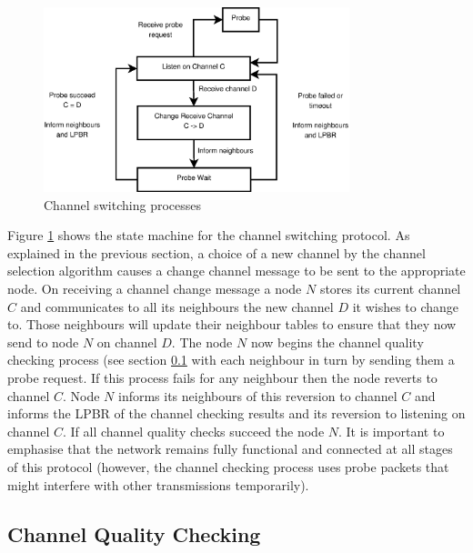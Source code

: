 
\begin{figure}
\centering
\includegraphics[width=3.5in]{Diagram1.eps}
\caption{Channel switching processes}
\label{fig_sim}
\end{figure}

Figure \ref{fig_sim} shows the state machine for the channel switching protocol.
As explained in the previous section, a choice of a new channel by the channel selection algorithm causes a change channel message to be sent to the appropriate node. 
On receiving a channel change message a node $N$ stores its current channel $C$ and communicates to all its neighbours the new channel $D$ it wishes to change to.  Those neighbours will update their neighbour tables to ensure that they now send to node $N$ on channel $D$.  The node $N$ now begins the channel quality checking process (see section \ref{sec:channelquality} with each neighbour in turn by sending them a probe request.  If this process fails for any neighbour then the node reverts to channel $C$.  Node $N$ informs its neighbours of this reversion to channel $C$ and informs the LPBR of the channel checking results and its reversion to listening on channel $C$. If all channel quality checks succeed the node $N$. It is important to emphasise that the network remains fully functional and connected at all stages of this protocol (however, the channel checking process uses probe packets that might interfere with other transmissions temporarily).

\subsection{Channel Quality Checking}
\label{sec:channelquality}

